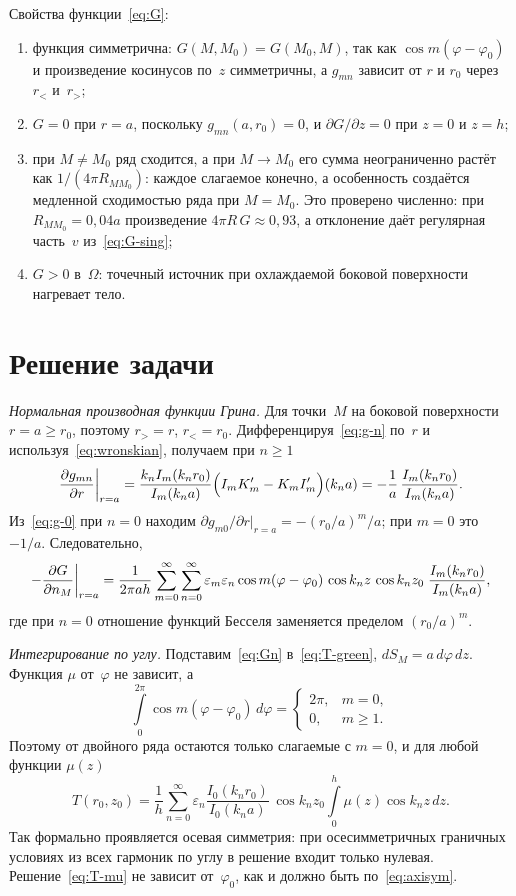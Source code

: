 Свойства функции~\eqref{eq:G}:
\begin{enumerate}
  \item функция симметрична: $G(M,M_0)=G(M_0,M)$, так как
        $\cos m(\varphi-\varphi_0)$ и произведение косинусов по~$z$
        симметричны, а $g_{mn}$ зависит от $r$ и $r_0$ через $r_<$
        и~$r_>$;
  \item $G=0$ при $r=a$, поскольку $g_{mn}(a,r_0)=0$, и
        $\partial G/\partial z=0$ при $z=0$ и $z=h$;
  \item при $M\ne M_0$ ряд сходится, а при $M\to M_0$ его сумма неограниченно
        растёт как $1/(4\pi R_{MM_0})$: каждое слагаемое конечно,
        а особенность создаётся медленной сходимостью ряда при
        $M=M_0$. Это проверено численно: при $R_{MM_0}=0{,}04a$ произведение
        $4\pi R\,G\approx0{,}93$, а отклонение даёт регулярная
        часть~$v$ из~\eqref{eq:G-sing};
  \item $G>0$ в~$\Omega$: точечный источник при охлаждаемой боковой
        поверхности нагревает тело.
\end{enumerate}

\section{Решение задачи}
\label{sec:solution}

\emph{Нормальная производная функции Грина.} Для точки~$M$ на боковой
поверхности $r=a\ge r_0$, поэтому $r_>=r$, $r_<=r_0$. Дифференцируя~\eqref{eq:g-n}
по~$r$ и используя~\eqref{eq:wronskian}, получаем при $n\ge1$
\[
\dfrac{\partial g_{mn}}{\partial r}\bigg|_{r=a}
=\frac{k_n I_m(k_n r_0)}{I_m(k_n a)}
\Bigl(I_m K_m'-K_m I_m'\Bigr)(k_n a)
=-\frac{1}{a}\,\frac{I_m(k_n r_0)}{I_m(k_n a)} .
\]
Из~\eqref{eq:g-0} при $n=0$ находим
$\partial g_{m0}/\partial r\big|_{r=a}=-(r_0/a)^m/a$; при $m=0$ это
$-1/a$. Следовательно,
\begin{equation}
\label{eq:Gn}
-\dfrac{\partial G}{\partial n_M}\bigg|_{r=a}=\frac{1}{2\pi a h}
\sum_{m=0}^{\infty}\sum_{n=0}^{\infty}\varepsilon_m\varepsilon_n
\cos m(\varphi-\varphi_0)\,\cos k_n z\,\cos k_n z_0\;
\frac{I_m(k_n r_0)}{I_m(k_n a)},
\end{equation}
где при $n=0$ отношение функций Бесселя заменяется пределом
$(r_0/a)^m$.

\emph{Интегрирование по углу.} Подставим~\eqref{eq:Gn}
в~\eqref{eq:T-green}, $dS_M=a\,d\varphi\,dz$. Функция $\mu$ от~$\varphi$
не зависит, а
\[
\int\limits_0^{2\pi}\cos m(\varphi-\varphi_0)\,d\varphi=
\begin{cases}
2\pi, & m=0,\\
0,    & m\ge1 .
\end{cases}
\]
Поэтому от двойного ряда остаются только слагаемые с $m=0$, и для любой
функции $\mu(z)$
\begin{equation}
\label{eq:T-mu}
T(r_0,z_0)=\frac{1}{h}\sum_{n=0}^{\infty}\varepsilon_n
\frac{I_0(k_n r_0)}{I_0(k_n a)}\,\cos k_n z_0
\int\limits_0^h\mu(z)\cos k_n z\,dz .
\end{equation}
Так формально проявляется осевая симметрия: при осесимметричных
граничных условиях из всех гармоник по углу в решение входит только
нулевая. Решение~\eqref{eq:T-mu} не зависит от~$\varphi_0$, как и
должно быть по~\eqref{eq:axisym}.

